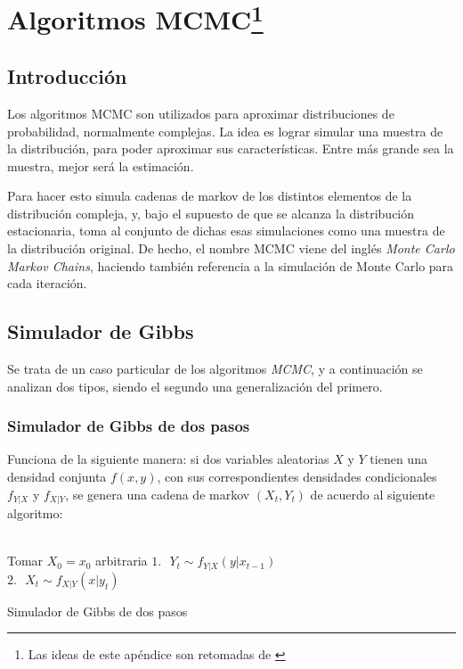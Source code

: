 \chapter[Algoritmos MCMC]{Algoritmos MCMC\footnote{Las ideas de este ap\'endice son retomadas de \cite{Robert_MCMC}} }\label{chap:MCMC}

\section {Introducci\'on}

Los algoritmos MCMC son utilizados para aproximar distribuciones de probabilidad, normalmente complejas. La idea es lograr simular una muestra de la distribuci\'on, para poder aproximar sus caracter\'isticas. Entre m\'as grande sea la muestra, mejor ser\'a la estimaci\'on.

Para hacer esto simula cadenas de markov de los distintos elementos de la distribuci\'on compleja, y, bajo el supuesto de que se alcanza la distribuci\'on estacionaria, toma al conjunto de dichas esas simulaciones como una muestra de la distribuci\'on original. De hecho, el nombre MCMC viene del ingl\'es \textit{Monte Carlo Markov Chains}, haciendo tambi\'en referencia a la simulaci\'on de Monte Carlo para cada iteraci\'on.

\section{Simulador de Gibbs}

Se trata de un caso particular de los algoritmos \textit{MCMC}, y a continuaci\'on se analizan dos tipos, siendo el segundo una generalizaci\'on del primero.

\subsection{Simulador de Gibbs de dos pasos}

Funciona de la siguiente manera: si dos variables aleatorias $X$ y $Y$ tienen una densidad conjunta $f(x,y)$, con sus correspondientes densidades condicionales $f_{Y|X}$ y $f_{X|Y}$, se genera una cadena de markov $(X_t,Y_t)$ de acuerdo al siguiente algoritmo:
\\ \\
\begin{algorithm}[H]
 {Tomar $X_0 = x_0$ arbitraria \;
     {
        $1. \text{ } Y_t \sim f_{Y|X}(y|x_{t-1})\;$\\
        $2. \text{ } X_t \sim f_{X|Y}(x|y_{t})\;$
     }
 }
 \caption{Simulador de Gibbs de dos pasos}
\end{algorithm}
\BlankLine

